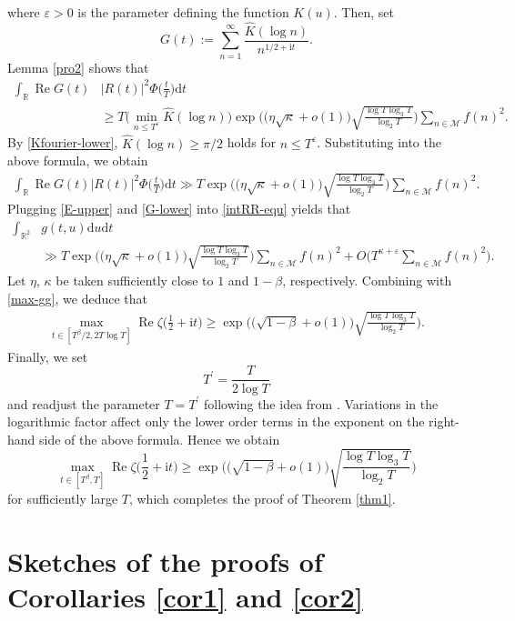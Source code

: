 \documentclass[12pt,reqno]{amsart}
\theoremstyle{definition}
\numberwithin{equation}{section}
\newcommand{\bgl}{\big(}
\newcommand{\bgr}{\big)}
\newcommand{\bggl}{\bigg(}
\newcommand{\bggr}{\bigg)}
\newcommand{\Bgl}{\Big(}
\newcommand{\Bgr}{\Big)}
\newcommand{\lo}{\log_2}
\newcommand{\lt}{\log_3}
\newcommand{\ph}{\Phi}
\newcommand{\mbr}{\mathbb{R}}
\newcommand{\mcm}{\mathcal{M}}
\newcommand{\mmd}{\mathrm{d}}
\newcommand{\mit}{\mathrm{i}t}
\newcommand{\re}{\operatorname{Re}}
\begin{document}
where \(\varepsilon>0\) is the parameter defining the function \(K(u)\). Then, set
\[
G(t) := \sum_{n=1}^\infty \frac{\widehat{K}(\log n)}{n^{1/2+\mit}}.
\]
Lemma \ref{pro2} shows that 
\begin{align*}
     \int_\mbr\re G(t)& |R(t)|^2\ph\Bgl\frac{t}{T} \Bgr \mmd t  \nonumber \\
        &\ge T \bgl\min_{n \le T^\varepsilon} \widehat{K}(\log n)\bgr \exp \bggl \bgl \eta \sqrt{\kappa} +o(1) \bgr \sqrt{\frac{\log T \lt T}{\lo T}}\bggr \sum_{n \in \mcm}f(n)^2.
\end{align*}
By \eqref{Kfourier-lower}, \(\widehat{K}(\log n) \ge \pi/2\) holds for \(n \le T^\varepsilon\). Substituting into the above formula, we obtain 
\begin{align}
\label{G-lower}
         \int_\mbr\re G(t) |R(t)|^2\ph\Bgl\frac{t}{T} \Bgr \mmd t \gg T  \exp \bggl \bgl \eta \sqrt{\kappa} +o(1) \bgr \sqrt{\frac{\log T \lt T}{\lo T}}\bggr \sum_{n \in \mcm}f(n)^2.
\end{align}
Plugging \eqref{E-upper} and \eqref{G-lower} into \eqref{intRR-equ} yields that 
\begin{align*}
    \int_{\mbr^2} &g(t,u) \mmd u  \mmd t\\
   & \gg  T  \exp \bggl \bgl \eta \sqrt{\kappa} +o(1) \bgr \sqrt{\frac{\log T \lt T}{\lo T}}\bggr   \sum_{n \in \mcm}f(n)^2 
     + O\Bgl T^{\kappa+\varepsilon} \sum_{n \in \mcm}f(n)^2\Bgr .
\end{align*}
Let \(\eta\), \(\kappa\) be taken sufficiently close to \(1\) and \(1-\beta\), respectively. Combining with \eqref{max-gg}, we deduce that
\begin{align*}
    \max_{t \in [T^\beta/2,2T\log T]} \re \zeta\Bgl\frac{1}{2}+\mit\Bgr  \ge \exp\bggl \bgl \sqrt{1-\beta} +o(1)\bgr \sqrt{\frac{\log T \lt T}{\lo T}} \bggr.
\end{align*}
Finally, we set 
\[
T^\prime = \frac{T}{2\log T}
\]
and readjust the parameter \(T=T^\prime\) following the idea from \cite{bondarenko2018argument}. Variations in the logarithmic factor affect only the lower order terms in the exponent on the right-hand side of the above formula. Hence we obtain
\[
\max_{t \in [T^\beta,T]} \re \zeta\Bgl\frac{1}{2}+\mit\Bgr \ge \exp\bggl\bgl\sqrt{1-\beta}+o(1)\bgr\sqrt{\frac{\log T \lt T}{\lo T}} \bggr
\]
for sufficiently large \(T\), which completes the proof of Theorem \ref{thm1}.

\section{Sketches of the proofs of Corollaries \ref{cor1} and \ref{cor2}}
\label{secsketch}
\end{document}
